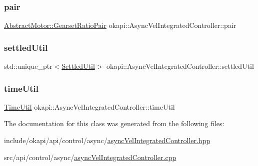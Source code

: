 \subsubsection{\texorpdfstring{pair}{pair}}
{\footnotesize\ttfamily \mbox{\hyperlink{structokapi_1_1AbstractMotor_1_1GearsetRatioPair}{Abstract\+Motor\+::\+Gearset\+Ratio\+Pair}} okapi\+::\+Async\+Vel\+Integrated\+Controller\+::pair\hspace{0.3cm}{\ttfamily [protected]}}

\mbox{\label{classokapi_1_1AsyncVelIntegratedController_aa9890eed087ca10be20b6fc3936508b9}} 
\subsubsection{\texorpdfstring{settledUtil}{settledUtil}}
{\footnotesize\ttfamily std\+::unique\+\_\+ptr$<$\mbox{\hyperlink{classokapi_1_1SettledUtil}{Settled\+Util}}$>$ okapi\+::\+Async\+Vel\+Integrated\+Controller\+::settled\+Util\hspace{0.3cm}{\ttfamily [protected]}}

\mbox{\label{classokapi_1_1AsyncVelIntegratedController_a2cfa27f4610d93fa505a0c82f11c9d16}} 
\subsubsection{\texorpdfstring{timeUtil}{timeUtil}}
{\footnotesize\ttfamily \mbox{\hyperlink{classokapi_1_1TimeUtil}{Time\+Util}} okapi\+::\+Async\+Vel\+Integrated\+Controller\+::time\+Util\hspace{0.3cm}{\ttfamily [protected]}}



The documentation for this class was generated from the following files\+:\begin{DoxyCompactItemize}
\item 
include/okapi/api/control/async/\mbox{\hyperlink{asyncVelIntegratedController_8hpp}{async\+Vel\+Integrated\+Controller.\+hpp}}\item 
src/api/control/async/\mbox{\hyperlink{asyncVelIntegratedController_8cpp}{async\+Vel\+Integrated\+Controller.\+cpp}}\end{DoxyCompactItemize}
